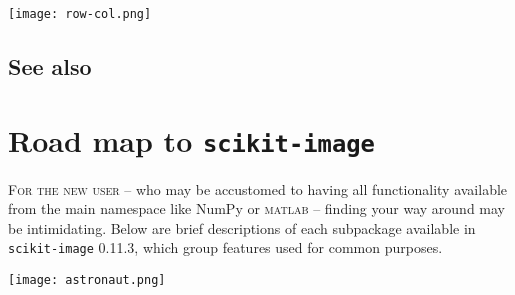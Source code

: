 \documentclass[nohyper, %
               ]{tufte-handout}
\DeclareRobustCommand{\ski}{\texttt{scikit-image}\xspace}
\DeclareRobustCommand{\np}{NumPy\xspace}
\newcommand{\release}{0.11.3\xspace}
\begin{document}
  \begin{marginfigure}[-1.3cm]%
    \texttt{[image: row-col.png]}
    \label{fig:row-col}
  \end{marginfigure}

\subsection{See also} %
  \label{sub:see_also}


\newpage
\section{Road map to \ski} %
  \label{sec:road_map}
  \textsc{For the new user} -- who may be accustomed to having all functionality available from the main namespace like \np or \textsc{matlab} -- finding your way around may be intimidating. Below are brief descriptions of each subpackage available in \ski \release, which group features used for common purposes.

  \begin{marginfigure}[1.9cm]%
    \texttt{[image: astronaut.png]}
    \label{fig:astronaut}
  \end{marginfigure}
\end{document}
